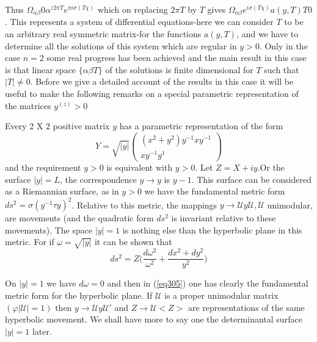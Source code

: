 Thus \; $\Omega_{\alpha \beta} 0 \alpha^{z 2 \pi T} e^{\pi i \sigma (T
  \chi)}$ \; which on replacing $2 \pi T$ by $T$ gives \break $\Omega_{\alpha
  \beta} e^{i \sigma (T \chi)} a(y, T) T 0$. This represents a
system of differential equations-here we can consider $T$ to be an
arbitrary real symmetric matrix-for the functions $a(y, T)$, and
we have to determine all the solutions of this system which are
regular in $y > 0$. Only in the case $n = 2$ some real
progress has been achieved and the main result in this case is that
linear space $\{ \alpha \beta T\}$ of the solutions is finite
dimensional for $T$ such that $|T| \neq 0$. Before we give a detailed
account of the results in this case it will be useful to make the
following remarks on a special parametric representation of the
matrices $y^{(z)} > 0$ 

Every 2 X 2 positive matrix $y$ has a parametric representation
of the form
\begin{equation*}
Y = \sqrt{|y|} \begin{pmatrix} (x^2 + y^2) y^{-1}    x
  y^{-1}\\ xy^{-1}   g^1 \end{pmatrix} \tag{304}\label{eq304} 
\end{equation*}\pageoriginale
and the requirement $y > 0$ is equivalent with $y > 0$. Let $Z =
X +i y$.Or the surface $|y| = L$, the correspondence $y \to
y$ is $y -1$. This surface can be considered as a Riemannian
surface, as in $y > 0$ we have the fundamental metric form $ds^2
= \sigma (y^{-1} \tau y)^2$. Relative to this metric, the
mappings $y \to \mathcal{U} y \mathcal{U}, \mathcal{U}$
unimodular, are movements (and the quadratic form $ds^2$  is invariant
relative to these movements). The space $|y| = 1$ is nothing
else than the hyperbolic plane in this metric. For if $\omega =
\sqrt{|y|}$ it can be shown that  
\begin{equation*}
ds^2 = Z \Bigg( \frac{d \omega^2}{\omega^2} + \frac{dx^2 + dy^2} {y^2}
\Bigg) \tag{305}\label{eq305} 
\end{equation*}

 On $|y| = 1$ we have $d \omega = 0$ and then in (\ref{eq305}) one has
 clearly the fundamental metric form for the hyperbolic plane. If
 $\mathcal{U}$ is a proper unimodular matrix $( \varphi | \mathcal{U}
 | = 1)$ then $y \to \mathcal{U} y \mathcal{U}'$ and $Z \to
 \mathcal{U} < Z >$ are representations of the same hyperbolic
 movement. We shall have more to say one the determinantal surface
 $|y| = 1$ later. 

